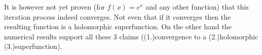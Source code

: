It is however not yet proven (for $f(x)=e^x$ and any other function) that this
iteration process indeed converges. Not even that if it converges then
the resulting function is a holomorphic superfunction. On the other
hand the numerical results support all these 3 claims ((1.)convergence  to
a (2.)holomorphic (3.)superfunction).




